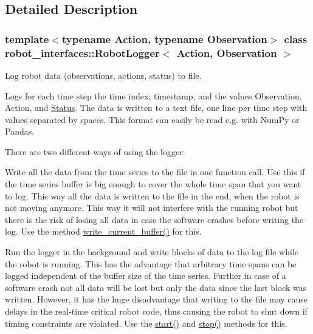 \subsection{Detailed Description}
\subsubsection*{template$<$typename Action, typename Observation$>$\newline
class robot\+\_\+interfaces\+::\+Robot\+Logger$<$ Action, Observation $>$}

Log robot data (observations, actions, status) to file. 

Logs for each time step the time index, timestamp, and the values Observation, Action, and \hyperlink{structrobot__interfaces_1_1Status}{Status}. The data is written to a text file, one line per time step with values separated by spaces. This format can easily be read e.\+g. with Num\+Py or Pandas.

There are two different ways of using the logger\+:


\begin{DoxyEnumerate}
\item Write all the data from the time series to the file in one function call. Use this if the time series buffer is big enough to cover the whole time span that you want to log. This way all the data is written to the file in the end, when the robot is not moving anymore. This way it will not interfere with the running robot but there is the risk of losing all data in case the software crashes before writing the log. Use the method {\ttfamily \hyperlink{classrobot__interfaces_1_1RobotLogger_a36b22a51e9615ee696a5baa350d3dee0}{write\+\_\+current\+\_\+buffer()}} for this.
\item Run the logger in the background and write blocks of data to the log file while the robot is running. This has the advantage that arbitrary time spans can be logged independent of the buffer size of the time series. Further in case of a software crash not all data will be lost but only the data since the last block was written. However, it has the huge disadvantage that writing to the file may cause delays in the real-\/time critical robot code, thus causing the robot to shut down if timing constraints are violated. Use the {\ttfamily \hyperlink{classrobot__interfaces_1_1RobotLogger_a7a1b50c75aab3255ac7e6d412de833d1}{start()}} and {\ttfamily \hyperlink{classrobot__interfaces_1_1RobotLogger_a55ec7dcacd849adee53fa49a2a0c8234}{stop()}} methods for this.
\end{DoxyEnumerate}



